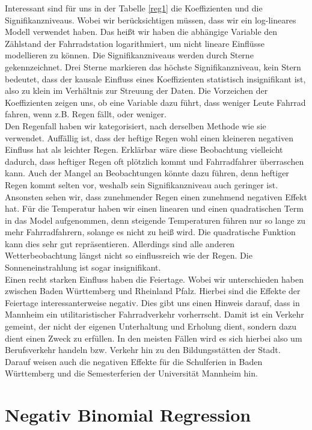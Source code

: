 \documentclass[a4paper,12pt]{thesis}
\begin{document}
Interessant sind für uns in der Tabelle \ref{reg1} die Koeffizienten und die Signifikanzniveaus. Wobei wir berücksichtigen müssen, dass wir ein log-lineares Modell verwendet haben. Das heißt wir haben die abhängige Variable den Zählstand der Fahrradstation logarithmiert, um nicht lineare Einflüsse modellieren zu können. Die Signifikanzniveaus werden durch Sterne gekennzeichnet. Drei Sterne markieren das höchste Signifikanzniveau, kein Stern bedeutet, dass der kausale Einfluss eines Koeffizienten statistisch insignifikant ist, also zu klein im Verhältnis zur Streuung der Daten. Die Vorzeichen der Koeffizienten zeigen uns, ob eine Variable dazu führt, dass weniger Leute Fahrrad fahren, wenn z.B. Regen fällt, oder weniger.\\ 
Den Regenfall haben wir kategorisiert, nach derselben Methode wie sie \cite{Wessel2020} verwendet. Auffällig ist, dass der heftige Regen wohl einen kleineren negativen Einfluss hat als leichter Regen. Erklärbar wäre diese Beobachtung vielleicht dadurch, dass heftiger Regen oft plötzlich kommt und Fahrradfahrer überraschen kann. Auch der Mangel an Beobachtungen könnte dazu führen, denn heftiger Regen kommt selten vor, weshalb sein Signifikanzniveau auch geringer ist. Ansonsten sehen wir, dass zunehmender Regen einen zunehmend negativen Effekt hat. Für die Temperatur haben wir einen linearen und einen quadratischen Term in das Model aufgenommen, denn steigende Temperaturen führen nur so lange zu mehr Fahrradfahrern, solange es nicht zu heiß wird. Die quadratische Funktion kann dies sehr gut repräsentieren. Allerdings sind alle anderen Wetterbeobachtung längst nicht so einflussreich wie der Regen. Die Sonneneinstrahlung ist sogar insignifikant.\\
Einen recht starken Einfluss haben die Feiertage. Wobei wir unterschieden haben zwischen Baden Württemberg und Rheinland Pfalz. Hierbei sind die Effekte der Feiertage interessanterweise negativ. Dies gibt uns einen Hinweis darauf, dass in Mannheim ein utilitaristischer Fahrradverkehr vorherrscht. Damit ist ein Verkehr gemeint, der nicht der eigenen Unterhaltung und Erholung dient, sondern dazu dient einen Zweck zu erfüllen. In den meisten Fällen wird es sich hierbei also um Berufsverkehr handeln bzw. Verkehr hin zu den Bildungsstätten der Stadt. Darauf weisen auch die negativen Effekte für die Schulferien in Baden Württemberg und die Semesterferien der Universität Mannheim hin.\\

\section{Negativ Binomial Regression}
\end{document}
